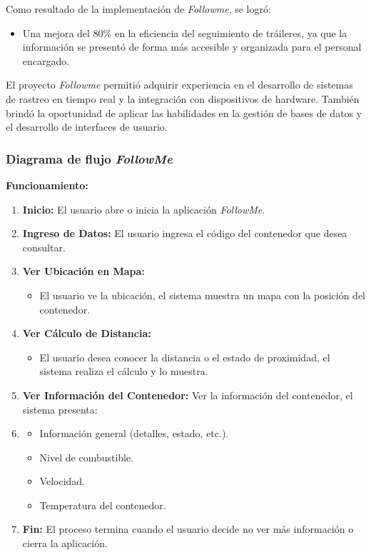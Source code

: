 \documentclass[protocolo.tex]{subfiles}
\begin{document}
Como resultado de la implementación de \textit{Followme}, se logró:

\begin{itemize}
\item Una mejora del 80\% en la eficiencia del seguimiento de tráileres, ya que la información se  presentó  de forma más accesible y organizada para el personal encargado.
\end{itemize}

El proyecto \textit{Followme} permitió adquirir experiencia en el desarrollo de sistemas de rastreo en tiempo real y la integración con dispositivos de hardware. También brindó la oportunidad de aplicar las habilidades en la gestión de bases de datos y el desarrollo de interfaces de usuario.

\subsubsection{Diagrama de flujo \textit{FollowMe}} 
\textbf{Funcionamiento:}
\begin{enumerate}
    \item \textbf{Inicio:}  
    El usuario abre o inicia la aplicación \textit{FollowMe}.
    \item \textbf{Ingreso de Datos:}  
    El usuario ingresa el código del contenedor que desea consultar.
    \item \textbf{Ver Ubicación en Mapa:}  
    \begin{itemize}
        \item El usuario ve la ubicación, el sistema muestra un mapa con la posición del contenedor.
       
    \end{itemize}
    \item \textbf{Ver Cálculo de Distancia:} 
    \begin{itemize}
        \item El usuario desea conocer la distancia o el estado de proximidad, el sistema realiza el cálculo y lo muestra.
        
    \end{itemize}
    \item \textbf{Ver Información del Contenedor:} 
    Ver la información del contenedor, el sistema presenta:
    \item \begin{itemize}
        \item Información general (detalles, estado, etc.).
        \item Nivel de combustible.
        \item Velocidad.
        \item Temperatura del contenedor.
    \end{itemize}
    \item \textbf{Fin:} 
    El proceso termina cuando el usuario decide no ver más información o cierra la aplicación.
\end{enumerate}
\end{document}
